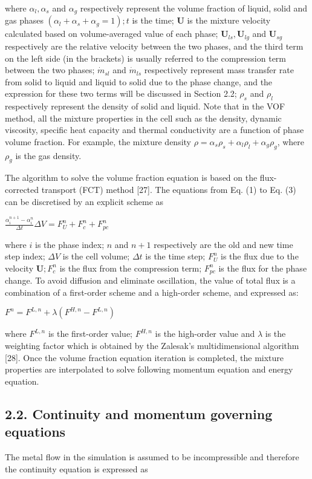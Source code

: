 \documentclass[10pt]{article}
\begin{document}
where $\alpha_{l}, \alpha_{s}$ and $\alpha_{g}$ respectively represent the volume fraction of liquid, solid and gas phases $\left(\alpha_{l}+\alpha_{s}+\alpha_{g}=1\right) ; t$ is the time; $\mathbf{U}$ is the mixture velocity calculated based on volume-averaged value of each phase; $\mathbf{U}_{l s}, \mathbf{U}_{l g}$ and $\mathbf{U}_{s g}$ respectively are the relative velocity between the two phases, and the third term on the left side (in the brackets) is usually referred to the compression term between the two phases; $\dot{m}_{s l}$ and $\dot{m}_{l s}$ respectively represent mass transfer rate from solid to liquid and liquid to solid due to the phase change, and the expression for these two terms will be discussed in Section 2.2; $\rho_{s}$ and $\rho_{l}$ respectively represent the density of solid and liquid. Note that in the VOF method, all the mixture properties in the cell such as the density, dynamic viscosity, specific heat capacity and thermal conductivity are a function of phase volume fraction. For example, the mixture density $\rho=\alpha_{s} \rho_{s}+\alpha_{l} \rho_{l}+\alpha_{g} \rho_{g}$, where $\rho_{g}$ is the gas density.

The algorithm to solve the volume fraction equation is based on the flux-corrected transport (FCT) method [27]. The equations from Eq. (1) to Eq. (3) can be discretised by an explicit scheme as

$\frac{\alpha_{i}^{n+1}-\alpha_{i}^{n}}{\Delta t} \Delta V=F_{U}^{n}+F_{c}^{n}+F_{p c}^{n}$

where $i$ is the phase index; $n$ and $n+1$ respectively are the old and new time step index; $\Delta V$ is the cell volume; $\Delta t$ is the time step; $F_{U}^{n}$ is the flux due to the velocity $\mathbf{U} ; F_{c}^{n}$ is the flux from the compression term; $F_{p c}^{n}$ is the flux for the phase change. To avoid diffusion and eliminate oscillation, the value of total flux is a combination of a first-order scheme and a high-order scheme, and expressed as:

$F^{n}=F^{L, n}+\lambda\left(F^{H, n}-F^{L, n}\right)$

where $F^{L, n}$ is the first-order value; $F^{H, n}$ is the high-order value and $\lambda$ is the weighting factor which is obtained by the Zalesak's multidimensional algorithm [28]. Once the volume fraction equation iteration is completed, the mixture properties are interpolated to solve following momentum equation and energy equation.

\subsection*{2.2. Continuity and momentum governing equations}
The metal flow in the simulation is assumed to be incompressible and therefore the continuity equation is expressed as
\end{document}
